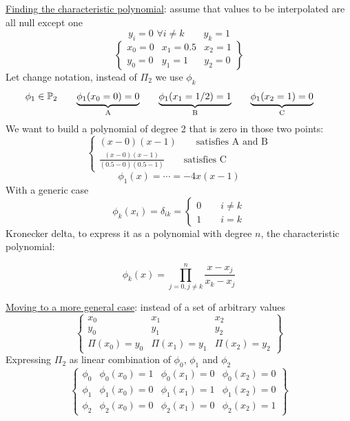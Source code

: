     \underline{Finding the characteristic polynomial}: assume that values to be interpolated are all null except one
    $$
    y_i=0\,\,\forall i\neq k\qquad y_k=1
    $$
    $$
    \begin{Bmatrix}    
        x_0=0 & x_1=0.5 & x_2=1\\
        y_0=0 & y_1=1 & y_2=0
    \end{Bmatrix}
    $$
    Let change notation, instead of $\Pi_2$ we use $\phi_k$
    $$
    \phi_1\in\mathbb{P}_2\qquad
    \underlabel{
        \phi_1(x_0=0)=0
    }{A}\qquad
    \underlabel{
        \phi_1(x_1=1/2)=1
    }{B}\qquad
    \underlabel{
        \phi_1(x_2=1)=0
    }{C}\qquad
    $$
    We want to build a polynomial of degree 2 that is zero in those two points:
    $$
    \begin{cases}
        (x-0)(x-1)\qquad\text{satisfies A and B}\\
        \frac{
            (x-0)(x-1)
        }{
            (0.5-0)(0.5-1)
        }\qquad\text{satisfies C}
    \end{cases}
    $$
    $$
    \phi_1(x)=\cdots=-4x(x-1)
    $$
    With a generic case
    $$
    \phi_k(x_i)=\delta_{ik}=\begin{cases}
        0\qquad i\neq k\\
        1\qquad i=k
    \end{cases}
    $$
    Kronecker delta, to express it as a polynomial with degree $n$, the characteristic polynomial:
    \begin{LARGE}
        $$
        \phi_k(x)=
        \prod_{j=0,j\neq k}^n
        \frac{
            x-x_j
        }{
            x_k-x_j
        }
        $$
    \end{LARGE}
    \underline{Moving to a more general case}: instead of a set of arbitrary values
    $$
    \begin{Bmatrix}
        x_0 & x_1 & x_2\\
        y_0 & y_1 & y_2\\
        \Pi(x_0)=y_0 & \Pi(x_1)=y_1 & \Pi(x_2)=y_2
    \end{Bmatrix}
    $$
    Expressing $\Pi_2$ as linear combination of $\phi_0$, $\phi_1$ and $\phi_2$
    $$
    \begin{Bmatrix}
        \phi_0 & \phi_0(x_0)=1 & \phi_0(x_1)=0 & \phi_0(x_2)=0\\
        \phi_1 & \phi_1(x_0)=0 & \phi_1(x_1)=1 & \phi_1(x_2)=0\\
        \phi_2 & \phi_2(x_0)=0 & \phi_2(x_1)=0 & \phi_2(x_2)=1
    \end{Bmatrix}
    $$
